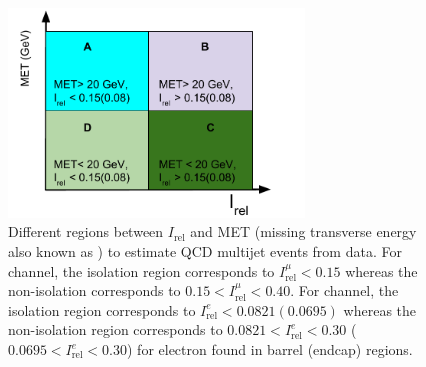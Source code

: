 \begin{figure}
\begin{center}
\includegraphics[width=0.70\textwidth]{Image/abcd_region.pdf}
\caption{Different regions between $I_{\text{rel}}$ and MET (missing transverse energy also known as
	\MET) to estimate QCD multijet events from data. For \mujets channel, the isolation region 
	corresponds to $I_{\text{rel}}^{\mu} < 0.15$ whereas the non-isolation corresponds to 
    $0.15 < I_{\text{rel}}^{\mu} < 0.40$. For \ejets channel, the isolation region 
    corresponds to $I_{\text{rel}}^{e} < 0.0821 (0.0695)$ whereas the non-isolation 
    region corresponds to $0.0821 <I_{\text{rel}}^{e} < 0.30$ 
    ($0.0695 <I_{\text{rel}}^{e} < 0.30$) for electron found in barrel (endcap) regions.
}
\label{fig:abcd}
\end{center}
\end{figure}


